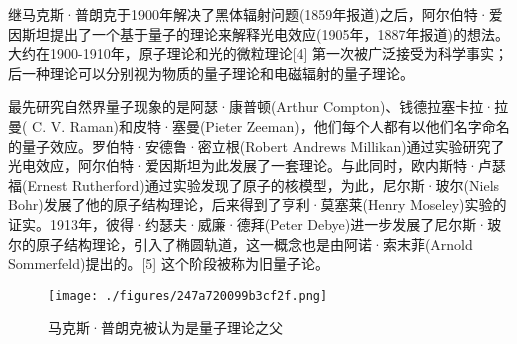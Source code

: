 继马克斯·普朗克于1900年解决了黑体辐射问题(1859年报道)之后，阿尔伯特·爱因斯坦提出了一个基于量子的理论来解释光电效应(1905年，1887年报道)的想法。 大约在1900-1910年，原子理论和光的微粒理论[4] 第一次被广泛接受为科学事实；后一种理论可以分别视为物质的量子理论和电磁辐射的量子理论。

最先研究自然界量子现象的是阿瑟·康普顿(Arthur Compton)、钱德拉塞卡拉·拉曼( C. V. Raman)和皮特·塞曼(Pieter Zeeman)，他们每个人都有以他们名字命名的量子效应。罗伯特·安德鲁·密立根(Robert Andrews Millikan)通过实验研究了光电效应，阿尔伯特·爱因斯坦为此发展了一套理论。与此同时，欧内斯特·卢瑟福(Ernest Rutherford)通过实验发现了原子的核模型，为此，尼尔斯·玻尔(Niels Bohr)发展了他的原子结构理论，后来得到了亨利·莫塞莱(Henry Moseley)实验的证实。1913年，彼得·约瑟夫·威廉·德拜(Peter Debye)进一步发展了尼尔斯·玻尔的原子结构理论，引入了椭圆轨道，这一概念也是由阿诺·索末菲(Arnold Sommerfeld)提出的。[5] 这个阶段被称为旧量子论。

\begin{figure}[ht]
\centering
\texttt{[image: ./figures/247a720099b3cf2f.png]}
\caption{马克斯·普朗克被认为是量子理论之父} \label{fig_LZLX_1}
\end{figure}




















